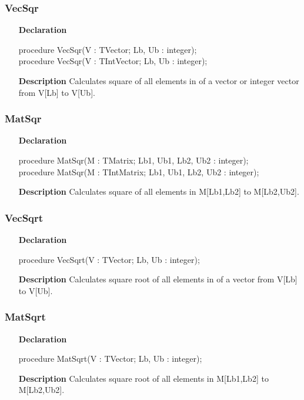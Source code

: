 \documentclass[12pt,a4paper,oneside]{report}
\newcommand{\declarationitem}[1]{\textbf{#1}}
\newcommand{\descriptiontitle}[1]{\textbf{#1}}
\begin{document}
\subsubsection{VecSqr}
\label{uvecfunc:VecSqr}
\begin{itemize}
	\item[\declarationitem{Declaration}\hfill]
	\begin{flushleft}
procedure VecSqr(V : TVector; Lb, Ub : integer); \\ \vspace{4pt}	
procedure VecSqr(V : TIntVector; Lb, Ub : integer); 
	\end{flushleft}
	\item[\descriptiontitle{Description}\hfill]
	Calculates square of all elements in of a vector or integer vector from V[Lb] to V[Ub].
\end{itemize}
\subsubsection{MatSqr}
\label{uvecfunc:MatSqr}
\begin{itemize}
	\item[\declarationitem{Declaration}\hfill]
	\begin{flushleft}
procedure MatSqr(M : TMatrix; Lb1, Ub1, Lb2, Ub2 : integer); \\ \vspace{4pt} 
procedure MatSqr(M : TIntMatrix; Lb1, Ub1, Lb2, Ub2 : integer); 
	\end{flushleft}
	\item[\descriptiontitle{Description}\hfill]
		Calculates square of all elements in M[Lb1,Lb2] to M[Lb2,Ub2].
\end{itemize}
\subsubsection{VecSqrt}
\label{uvecfunc:VecSqrt}
\begin{itemize}
	\item[\declarationitem{Declaration}\hfill]
	\begin{flushleft}
procedure VecSqrt(V : TVector; Lb, Ub : integer); 
	\end{flushleft}
	\item[\descriptiontitle{Description}\hfill]
		Calculates square root of all elements in of a vector from V[Lb] to V[Ub].
\end{itemize}
\subsubsection{MatSqrt}
\label{uvecfunc:MatSqrt}
\begin{itemize}
	\item[\declarationitem{Declaration}\hfill]
	\begin{flushleft}
		procedure MatSqrt(V : TVector; Lb, Ub : integer); 
	\end{flushleft}
	\item[\descriptiontitle{Description}\hfill]
		Calculates square root of all elements in M[Lb1,Lb2] to M[Lb2,Ub2].
\end{itemize}
\end{document}
